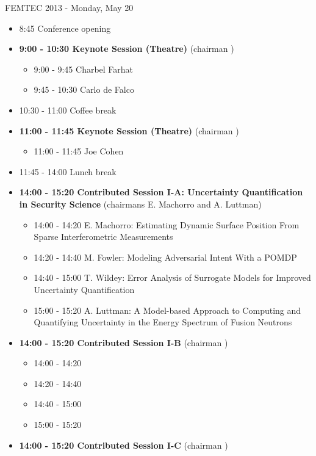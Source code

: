 \documentclass[10pt, A4]{article}%
\begin{document}
\centerline{\huge FEMTEC 2013 - Monday, May 20}
\vspace{4mm}

\begin{itemize}    
  \item 8:45 Conference opening
  \item {\bf 9:00 - 10:30 Keynote Session (Theatre)} (chairman ) 
  \begin{itemize}
    \item 9:00 - 9:45 Charbel Farhat
    \item 9:45 - 10:30 Carlo de Falco
  \end{itemize}
  \item 10:30 - 11:00 Coffee break
  \item {\bf 11:00 - 11:45 Keynote Session (Theatre)} (chairman ) 
  \begin{itemize}
    \item 11:00 - 11:45 Joe Cohen
  \end{itemize}
  \item 11:45 - 14:00 Lunch break      
  \item {\bf 14:00 - 15:20 Contributed Session I-A: Uncertainty Quantification in Security Science} (chairmans E. Machorro and A. Luttman) 
  \begin{itemize}
    \item 14:00 - 14:20 {E. Machorro}: {Estimating Dynamic Surface Position From Sparse Interferometric Measurements}
    \item 14:20 - 14:40 {M. Fowler}: {Modeling Adversarial Intent With a POMDP}
    \item 14:40 - 15:00 {T. Wildey}: {Error Analysis of Surrogate Models for Improved Uncertainty Quantification}
    \item 15:00 - 15:20 {A. Luttman}: {A Model-based Approach to Computing and Quantifying Uncertainty in the Energy Spectrum of Fusion Neutrons}
  \end{itemize}
  \item {\bf 14:00 - 15:20 Contributed Session I-B} (chairman ) 
  \begin{itemize}
    \item 14:00 - 14:20 
    \item 14:20 - 14:40 
    \item 14:40 - 15:00 
    \item 15:00 - 15:20 
  \end{itemize}
    \item {\bf 14:00 - 15:20 Contributed Session I-C} (chairman ) 
  \begin{itemize}

\end{itemize}
\end{itemize}
\end{document}
